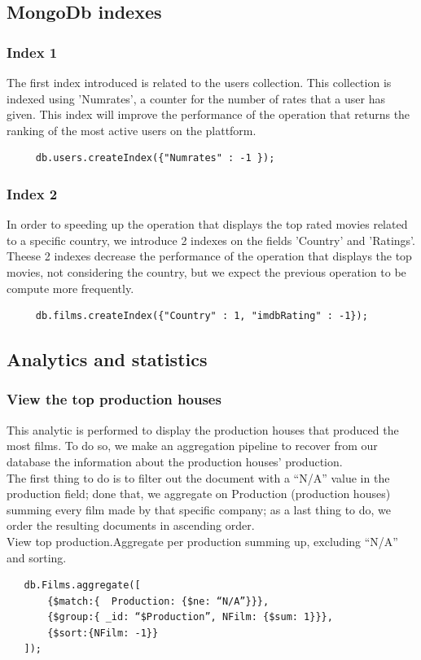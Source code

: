 \documentclass[a4paper, oneside]{article}
\begin{document}
\subsection{MongoDb indexes}
\subsubsection{Index 1}
The first index introduced is related to the users collection. This collection is indexed using 'Numrates', a counter for the number of rates that a user has given.
This index will improve the performance of the operation that returns the ranking of the most active users on the plattform.
\begin{verbatim}
     db.users.createIndex({"Numrates" : -1 });
\end{verbatim}
\subsubsection{Index 2}
In order to speeding up the operation that displays the top rated movies related to a specific country, we introduce 2 indexes on the fields 'Country' and 'Ratings'. Theese 2 indexes decrease the performance of the operation that displays the top movies, not considering the country, but we expect the previous operation to be compute more frequently.
\begin{verbatim}
     db.films.createIndex({"Country" : 1, "imdbRating" : -1});
\end{verbatim}

\subsection{Analytics and statistics}
\subsubsection{View the top production houses}
This analytic is performed to display the production houses that produced the most films. To do so, we make an aggregation pipeline to recover from our database the information about the production houses’ production. \\
The first thing to do is to filter out the document with a “N/A” value in the production field; done that, we aggregate on Production (production houses) summing every film made by that specific company; as a last thing to do, we order the resulting documents in ascending order.\\
View top production.Aggregate per production summing up, excluding “N/A” and sorting.
\begin{verbatim}
   db.Films.aggregate([
       {$match:{  Production: {$ne: “N/A”}}},
       {$group:{ _id: “$Production”, NFilm: {$sum: 1}}},
       {$sort:{NFilm: -1}}
   ]);
\end{verbatim}
\end{document}
